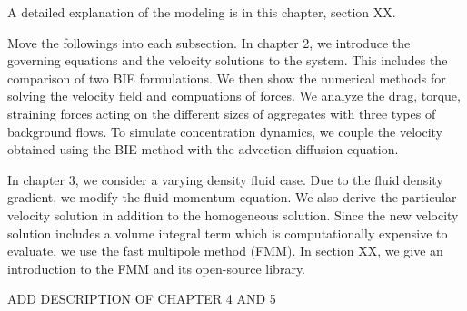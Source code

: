 A detailed explanation of the modeling is in this chapter, section XX.
\par
{\color{red} Move the followings into each subsection.}
In chapter 2, we introduce the governing equations and the velocity solutions to the system. This includes the comparison of two BIE formulations. We then show the numerical methods for solving the velocity field and compuations of forces. We analyze the drag, torque, straining forces acting on the different sizes of aggregates with three types of background flows.
 To simulate concentration dynamics, we couple the velocity obtained using the BIE method with the advection-diffusion equation.
\par
In chapter 3, we consider a varying density fluid case. Due to the fluid density gradient, we modify the fluid momentum equation. We also derive the particular velocity solution in addition to the homogeneous solution. Since the new velocity solution includes a volume integral term which is computationally expensive to evaluate, we use the fast multipole method (FMM). In section XX, we give an introduction to the FMM and its open-source library. 
\par
{\color{blue} ADD DESCRIPTION OF CHAPTER 4 AND 5}
